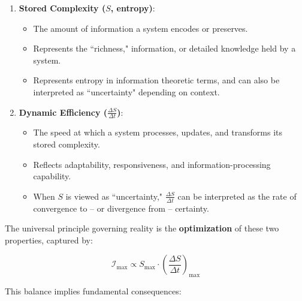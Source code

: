 \documentclass[12pt]{article}
\begin{document}
\begin{enumerate}
    \item \textbf{Stored Complexity (\( S \), entropy)}:  
    \begin{itemize}
        \item The amount of information a system encodes or preserves.
        \item Represents the ``richness," information, or detailed knowledge held by a system.
        \item Represents entropy in information theoretic terms, and can also be interpreted as ``uncertainty" depending on context.
    \end{itemize}

    \item \textbf{Dynamic Efficiency (\( \frac{\Delta S}{\Delta t} \))}:  
    \begin{itemize}
        \item The speed at which a system processes, updates, and transforms its stored complexity.
        \item Reflects adaptability, responsiveness, and information-processing capability.
        \item When $S$ is viewed as ``uncertainty," \( \frac{\Delta S}{\Delta t} \) can be interpreted as the rate of convergence to -- or divergence from -- certainty.
    \end{itemize}
\end{enumerate}

The universal principle governing reality is the \textbf{optimization} of these two properties, captured by:

\[
\mathcal{I}_{\text{max}} \propto S_{\text{max}} \cdot \left(\frac{\Delta S}{\Delta t}\right)_{\text{max}}
\]

This balance implies fundamental consequences:
\end{document}
